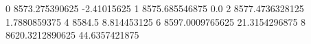 0 8573.275390625 -2.41015625
1 8575.685546875 0.0
2 8577.4736328125 1.7880859375
4 8584.5 8.814453125
6 8597.0009765625 21.3154296875
8 8620.3212890625 44.6357421875
